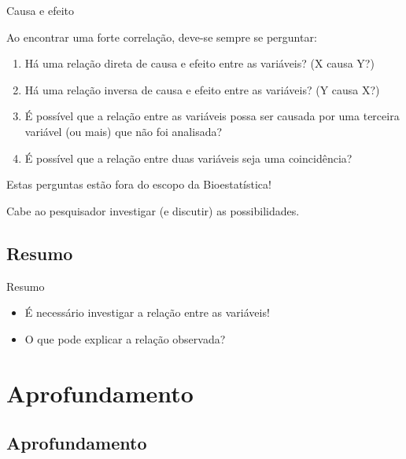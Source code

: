 \documentclass{beamer}
\begin{document}
\begin{frame}{Causa e efeito}
  {\small

    Ao encontrar uma forte correlação, deve-se sempre se perguntar:
  }

  \begin{enumerate}
    \footnotesize
  \item Há uma relação direta de causa e efeito entre as variáveis? (X
    causa Y?)

  \item Há uma relação inversa de causa e efeito entre as variáveis?
    (Y causa X?)

  \item É possível que a relação entre as variáveis possa ser causada
    por uma terceira variável (ou mais) que não foi analisada?

  \item É possível que a relação entre duas variáveis seja uma
    coincidência?
  \end{enumerate}
  \vfill
  \begin{block}{}
    \small
    Estas perguntas estão fora do escopo da Bioestatística!

    \bigskip
    Cabe ao pesquisador investigar (e discutir) as possibilidades.
  \end{block}
\end{frame}

\subsection{Resumo}

\begin{frame}{Resumo}
  \begin{itemize}
  \item É necessário investigar a relação entre as variáveis!
  \item O que pode explicar a relação observada?
  \end{itemize}
\end{frame}

\section{Aprofundamento}

\subsection{Aprofundamento}
\end{document}
